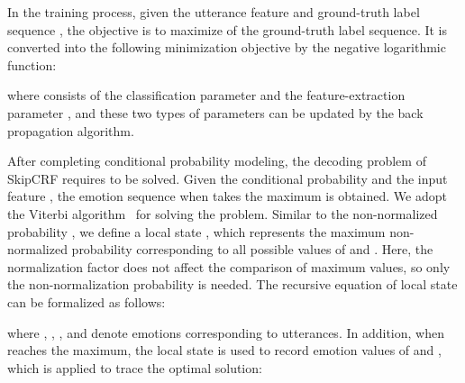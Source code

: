 \documentclass{SCIS2019}
\begin{document}
In the training process, given the utterance feature  and ground-truth label sequence , the objective is to maximize  of the ground-truth label sequence. It is converted into the following minimization objective by the negative logarithmic function: 

where  consists of the classification parameter  and the feature-extraction parameter , and these two types of parameters can be updated by the back propagation algorithm.

After completing conditional probability modeling, the decoding problem of SkipCRF requires to be solved. Given the conditional probability  and the input feature , the emotion sequence  when  takes the maximum is obtained. We adopt the Viterbi algorithm~\cite{Forney1973Theviterbi} for solving the problem. Similar to the non-normalized probability , we define a local state , which represents the maximum non-normalized probability corresponding to all possible values of  and . Here, the normalization factor does not affect the comparison of maximum values, so only the non-normalization probability is needed. The recursive equation of local state can be formalized as follows: 

where , , , and  denote emotions corresponding to utterances. In addition, when  reaches the maximum, the local state  is used to record emotion values of  and , which is applied to trace the optimal solution: 
\end{document}
